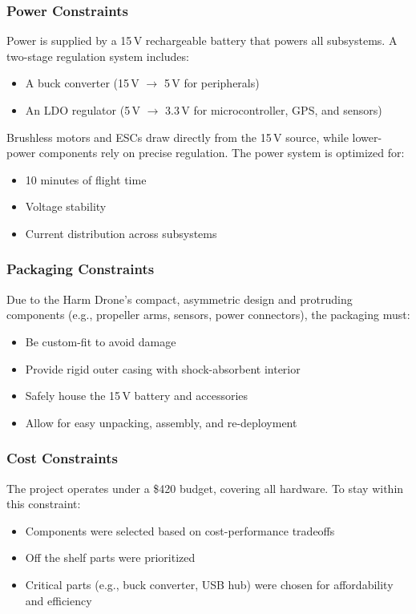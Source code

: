 \documentclass[12pt]{article}
\begin{document}
\subsubsection{Power Constraints}

Power is supplied by a 15\,V rechargeable battery that powers all subsystems. A two-stage regulation system includes:
\begin{itemize}
    \item A buck converter (15\,V $\rightarrow$ 5\,V for peripherals)
    \item An LDO regulator (5\,V $\rightarrow$ 3.3\,V for microcontroller, GPS, and sensors)
\end{itemize}

Brushless motors and ESCs draw directly from the 15\,V source, while lower-power components rely on precise regulation. The power system is optimized for:
\begin{itemize}
    \item 10 minutes of flight time
    \item Voltage stability
    \item Current distribution across subsystems
\end{itemize}

\subsubsection{Packaging Constraints}

Due to the Harm Drone’s compact, asymmetric design and protruding components (e.g., propeller arms, sensors, power connectors), the packaging must:
\begin{itemize}
    \item Be custom-fit to avoid damage
    \item Provide rigid outer casing with shock-absorbent interior
    \item Safely house the 15\,V battery and accessories
    \item Allow for easy unpacking, assembly, and re-deployment
\end{itemize}

\subsubsection{Cost Constraints}

The project operates under a \$420 budget, covering all hardware. To stay within this constraint:
\begin{itemize}
    \item Components were selected based on cost-performance tradeoffs
    \item Off the shelf parts were prioritized
    \item Critical parts (e.g., buck converter, USB hub) were chosen for affordability and efficiency
\end{itemize}
\end{document}
